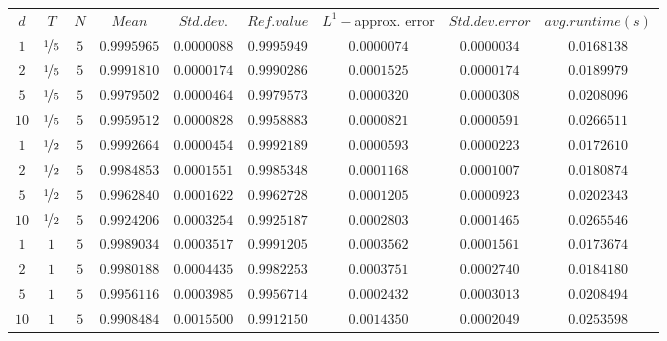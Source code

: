 \begin{tabular}{ccccccccc}
$d$ & $T$ & $N$ & $Mean$ & $Std. dev.$ & $Ref. value$ & $L^1-$approx. error & $Std. dev. error$ & $avg. runtime (s)$\\
$1$ & $\nicefrac{1}{5}$ & $5$ & $0.9995965$ & $0.0000088$ & $0.9995949$ & $0.0000074$ & $0.0000034$ & $0.0168138$\\
$2$ & $\nicefrac{1}{5}$ & $5$ & $0.9991810$ & $0.0000174$ & $0.9990286$ & $0.0001525$ & $0.0000174$ & $0.0189979$\\
$5$ & $\nicefrac{1}{5}$ & $5$ & $0.9979502$ & $0.0000464$ & $0.9979573$ & $0.0000320$ & $0.0000308$ & $0.0208096$\\
$10$ & $\nicefrac{1}{5}$ & $5$ & $0.9959512$ & $0.0000828$ & $0.9958883$ & $0.0000821$ & $0.0000591$ & $0.0266511$\\
$1$ & $\nicefrac{1}{2}$ & $5$ & $0.9992664$ & $0.0000454$ & $0.9992189$ & $0.0000593$ & $0.0000223$ & $0.0172610$\\
$2$ & $\nicefrac{1}{2}$ & $5$ & $0.9984853$ & $0.0001551$ & $0.9985348$ & $0.0001168$ & $0.0001007$ & $0.0180874$\\
$5$ & $\nicefrac{1}{2}$ & $5$ & $0.9962840$ & $0.0001622$ & $0.9962728$ & $0.0001205$ & $0.0000923$ & $0.0202343$\\
$10$ & $\nicefrac{1}{2}$ & $5$ & $0.9924206$ & $0.0003254$ & $0.9925187$ & $0.0002803$ & $0.0001465$ & $0.0265546$\\
$1$ & $1$ & $5$ & $0.9989034$ & $0.0003517$ & $0.9991205$ & $0.0003562$ & $0.0001561$ & $0.0173674$\\
$2$ & $1$ & $5$ & $0.9980188$ & $0.0004435$ & $0.9982253$ & $0.0003751$ & $0.0002740$ & $0.0184180$\\
$5$ & $1$ & $5$ & $0.9956116$ & $0.0003985$ & $0.9956714$ & $0.0002432$ & $0.0003013$ & $0.0208494$\\
$10$ & $1$ & $5$ & $0.9908484$ & $0.0015500$ & $0.9912150$ & $0.0014350$ & $0.0002049$ & $0.0253598$\\
\end{tabular}
